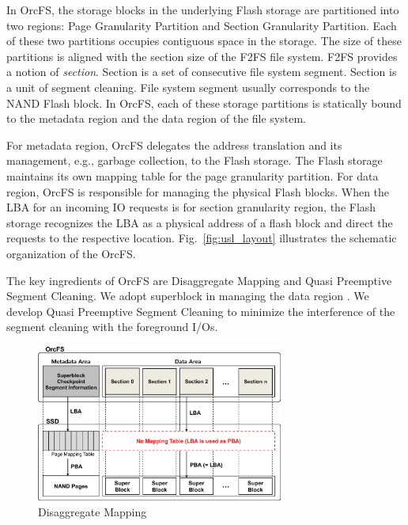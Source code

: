 \documentclass[pageno]{jpaper}
\begin{document}
In OrcFS, the storage blocks in the underlying Flash storage are
partitioned into two regions: Page Granularity Partition and Section
Granularity Partition.  Each of these two partitions occupies
contiguous space in the storage.  The size of these partitions is
aligned with the section size of the F2FS file system.  F2FS provides
a notion of \emph{section}. Section is a set of consecutive file system
segment. Section is a unit of segment cleaning. File system segment
usually corresponds to the NAND Flash block. In OrcFS, each of these
storage partitions is statically bound to the metadata region and the
data region of the file system.



For metadata region, OrcFS delegates the address translation and its
management, e.g., garbage collection, to the Flash storage. The Flash
storage maintains its own mapping table for the page granularity
partition. For data region, OrcFS is responsible for managing the
physical Flash blocks. When the LBA for an incoming IO requests is for
section granularity region, the Flash storage recognizes the LBA as a
physical address of a flash block and direct the requests to the
respective location.  Fig.~\ref{fig:usl_layout} illustrates the
schematic organization of the OrcFS.

The key ingredients of OrcFS are Disaggregate Mapping and Quasi
Preemptive Segment Cleaning.  We adopt superblock in managing the
data region \cite{park2009sub}.  We develop Quasi Preemptive Segment
Cleaning to minimize the interference of the segment cleaning with
the foreground I/Os.

\begin{figure}[t]
\begin{center}
\includegraphics[width=3.2in]{./figure/usl_layout}
\caption{Disaggregate Mapping}
\label{fig:da_mapping_layout}
\end{center}
\end{figure}
\end{document}
